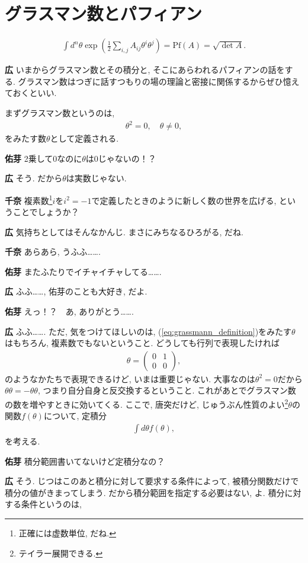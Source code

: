 \documentclass{ltjsarticle}
\theoremstyle{definition}
\newcommand{\parno}{\par\noindent}
\begin{document}
\section{グラスマン数とパフィアン}
\begin{tcolorbox}
\begin{gather}
  \int d^n\theta\exp\left(\frac12\sum_{i,j}A_{ij}\theta^i\theta^j\right)=\mathrm{Pf}(A)=\sqrt{\det A}.\label{eq:berezin_integral_pfaffian}
\end{gather}
\end{tcolorbox}
\parno
\textbf{広} いまからグラスマン数とその積分と, そこにあらわれるパフィアンの話をする. グラスマン数はつぎに話すつもりの場の理論と密接に関係するからぜひ憶えておくといい.\par
まずグラスマン数というのは,
\begin{gather}
  \theta^2=0,\quad\theta\ne0,\label{eq:grassmann_definition}
\end{gather}
をみたす数$\theta$として定義される.\parno
\textbf{佑芽} 2乗して0なのに$\theta$は0じゃないの！？\parno
\textbf{広} そう. だから$\theta$は実数じゃない.\parno
\textbf{千奈} 複素数\footnote{正確には虚数単位, だね.}$i$を$i^2=-1$で定義したときのように新しく数の世界を広げる, ということでしょうか？\parno
\textbf{広} 気持ちとしてはそんなかんじ. まさにみちなるひろがる, だね.\parno
\textbf{千奈} あらあら, うふふ…….\parno
\textbf{佑芽} またふたりでイチャイチャしてる…….\parno
\textbf{広} ふふ……, 佑芽のことも大好き, だよ.\parno
\textbf{佑芽} えっ！？　あ, ありがとう…….\parno
\textbf{広} ふふ……. ただ, 気をつけてほしいのは, (\ref{eq:grassmann_definition})をみたす$\theta$はもちろん, 複素数でもないということ. どうしても行列で表現したければ
\begin{gather}
  \theta=
  \begin{pmatrix}
    0&1\\0&0
  \end{pmatrix},
\end{gather}
のようなかたちで表現できるけど, いまは重要じゃない. 大事なのは$\theta^2=0$だから$\theta\theta=-\theta\theta$, つまり自分自身と反交換するということ. これがあとでグラスマン数の数を増やすときに効いてくる. ここで, 唐突だけど, じゅうぶん性質のよい\footnote{テイラー展開できる.}$\theta$の関数$f(\theta)$について, 定積分
\begin{gather}
  \int d\theta f(\theta),\label{eq:berezin_integral_1_variable}
\end{gather}
を考える.\parno
\textbf{佑芽} 積分範囲書いてないけど定積分なの？\parno
\textbf{広} そう. じつはこのあと積分に対して要求する条件によって, 被積分関数だけで積分の値がきまってしまう. だから積分範囲を指定する必要はない, よ. 積分に対する条件というのは,
\end{document}
